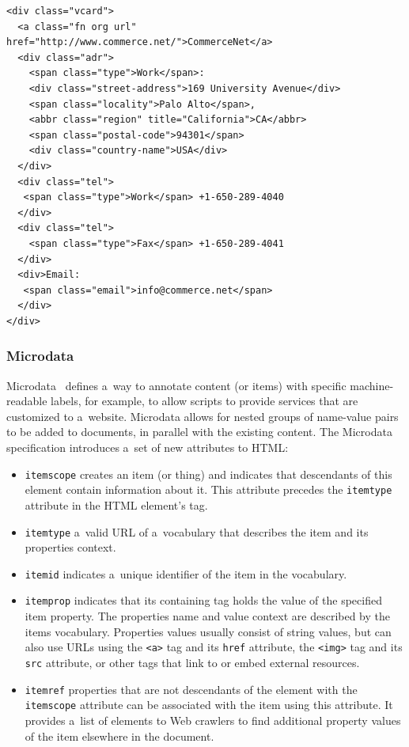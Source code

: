 \begin{lstlisting}[caption={
   [Sample code snippet with embedded hCard Microformat mark-up]
   {Sample code snippet with embedded \texttt{hCard} Microformat
    mark-up (\url{http://microformats.org/wiki/hcard})}
  },
  label={code:microformats}]
<div class="vcard">
  <a class="fn org url" href="http://www.commerce.net/">CommerceNet</a>
  <div class="adr">
    <span class="type">Work</span>:
    <div class="street-address">169 University Avenue</div>
    <span class="locality">Palo Alto</span>,
    <abbr class="region" title="California">CA</abbr>
    <span class="postal-code">94301</span>
    <div class="country-name">USA</div>
  </div>
  <div class="tel">
   <span class="type">Work</span> +1-650-289-4040
  </div>
  <div class="tel">
    <span class="type">Fax</span> +1-650-289-4041
  </div>
  <div>Email:
   <span class="email">info@commerce.net</span>
  </div>
</div>
\end{lstlisting}

\subsubsection{Microdata}

Microdata~\cite{hickson2012microdata} defines a~way to annotate
content (or items) with specific machine-readable labels,
for example, to allow scripts to provide services that are
customized to a~website.
Microdata allows for nested groups of name-value pairs
to be added to documents,
in parallel with the existing content.
The Microdata specification introduces
a~set of new attributes to HTML:

\begin{itemize}
  \item \texttt{itemscope} creates an item (or thing) and
        indicates that descendants of this element contain
        information about it. This attribute precedes the
        \texttt{itemtype} attribute in the HTML element's tag.
  \item \texttt{itemtype} a~valid URL of a~vocabulary that
        describes the item and its properties context.
  \item \texttt{itemid} indicates a~unique identifier
        of the item in the vocabulary.
  \item \texttt{itemprop} indicates that its containing tag
        holds the value of the specified item property.
        The properties name and value context are described by
        the items vocabulary. Properties values usually
        consist of string values,
        but can also use URLs using the \texttt{<a>} tag
        and its \texttt{href} attribute,
        the \texttt{<img>} tag and its \texttt{src} attribute,
        or other tags that link to or embed external resources.
  \item \texttt{itemref} properties that are not descendants of
        the element with the \texttt{itemscope} attribute
        can be associated with the item using this attribute.
        It provides a~list of elements to Web crawlers to find
        additional property values of the item
        elsewhere in the document.
\end{itemize}

